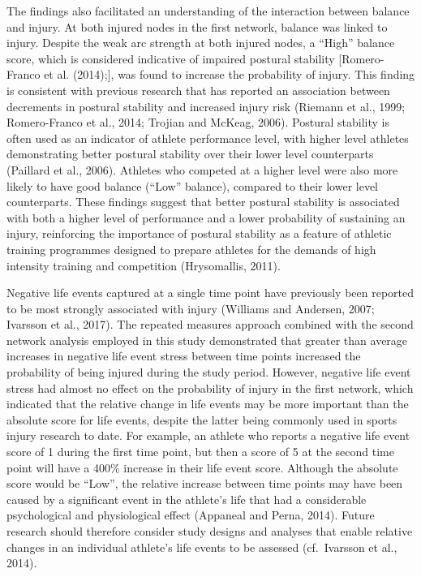 \documentclass[
  english,
  man,floatsintext]{apa6}
\begin{document}
The findings also facilitated an understanding of the interaction between balance and injury. At both injured nodes in the first network, balance was linked to injury. Despite the weak arc strength at both injured nodes, a ``High'' balance score, which is considered indicative of impaired postural stability {[}Romero-Franco et al. (2014);{]}, was found to increase the probability of injury. This finding is consistent with previous research that has reported an association between decrements in postural stability and increased injury risk (Riemann et al., 1999; Romero-Franco et al., 2014; Trojian and McKeag, 2006).
Postural stability is often used as an indicator of athlete performance level, with higher level athletes demonstrating better postural stability over their lower level counterparts (Paillard et al., 2006).
Athletes who competed at a higher level were also more likely to have good balance (``Low'' balance), compared to their lower level counterparts.
These findings suggest that better postural stability is associated with both a higher level of performance and a lower probability of sustaining an injury, reinforcing the importance of postural stability as a feature of athletic training programmes designed to prepare athletes for the demands of high intensity training and competition (Hrysomallis, 2011).

Negative life events captured at a single time point have previously been reported to be most strongly associated with injury (Williams and Andersen, 2007; Ivarsson et al., 2017).
The repeated measures approach combined with the second network analysis employed in this study demonstrated that greater than average increases in negative life event stress between time points increased the probability of being injured during the study period. However, negative life event stress had almost no effect on the probability of injury in the first network, which indicated that the relative change in life events may be more important than the absolute score for life events, despite the latter being commonly used in sports injury research to date.
For example, an athlete who reports a negative life event score of 1 during the first time point, but then a score of 5 at the second time point will have a 400\% increase in their life event score. Although the absolute score would be ``Low'', the relative increase between time points may have been caused by a significant event in the athlete's life that had a considerable psychological and physiological effect (Appaneal and Perna, 2014).
Future research should therefore consider study designs and analyses that enable relative changes in an individual athlete's life events to be assessed (cf.~Ivarsson et al., 2014).
\end{document}
